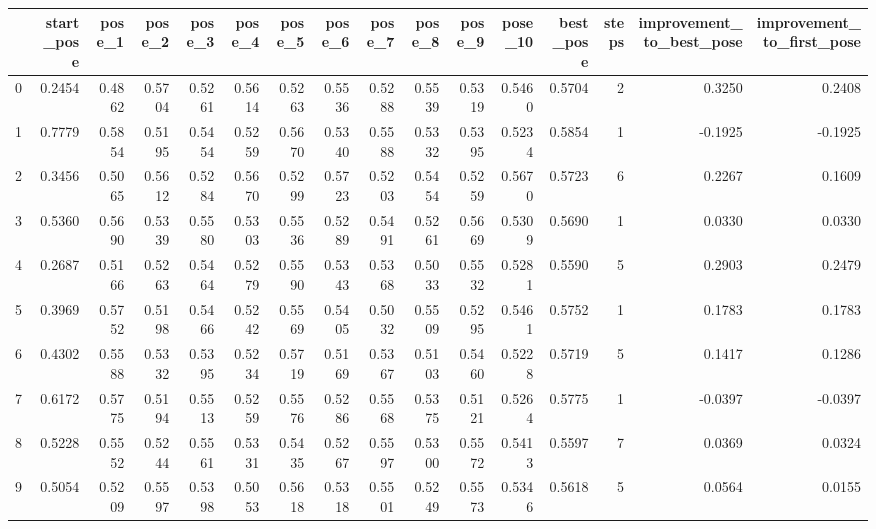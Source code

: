 \begin{tabular}{lrrrrrrrrrrrrrrr}
\toprule
{} &  start\_pose &  pose\_1 &  pose\_2 &  pose\_3 &  pose\_4 &  pose\_5 &  pose\_6 &  pose\_7 &  pose\_8 &  pose\_9 &  pose\_10 &  best\_pose &  steps &  improvement\_to\_best\_pose &  improvement\_to\_first\_pose \\
\midrule
0   &      0.2454 &  0.4862 &  0.5704 &  0.5261 &  0.5614 &  0.5263 &  0.5536 &  0.5288 &  0.5539 &  0.5319 &   0.5460 &     0.5704 &      2 &                    0.3250 &                     0.2408 \\
1   &      0.7779 &  0.5854 &  0.5195 &  0.5454 &  0.5259 &  0.5670 &  0.5340 &  0.5588 &  0.5332 &  0.5395 &   0.5234 &     0.5854 &      1 &                   -0.1925 &                    -0.1925 \\
2   &      0.3456 &  0.5065 &  0.5612 &  0.5284 &  0.5670 &  0.5299 &  0.5723 &  0.5203 &  0.5454 &  0.5259 &   0.5670 &     0.5723 &      6 &                    0.2267 &                     0.1609 \\
3   &      0.5360 &  0.5690 &  0.5339 &  0.5580 &  0.5303 &  0.5536 &  0.5289 &  0.5491 &  0.5261 &  0.5669 &   0.5309 &     0.5690 &      1 &                    0.0330 &                     0.0330 \\
4   &      0.2687 &  0.5166 &  0.5263 &  0.5464 &  0.5279 &  0.5590 &  0.5343 &  0.5368 &  0.5033 &  0.5532 &   0.5281 &     0.5590 &      5 &                    0.2903 &                     0.2479 \\
5   &      0.3969 &  0.5752 &  0.5198 &  0.5466 &  0.5242 &  0.5569 &  0.5405 &  0.5032 &  0.5509 &  0.5295 &   0.5461 &     0.5752 &      1 &                    0.1783 &                     0.1783 \\
6   &      0.4302 &  0.5588 &  0.5332 &  0.5395 &  0.5234 &  0.5719 &  0.5169 &  0.5367 &  0.5103 &  0.5460 &   0.5228 &     0.5719 &      5 &                    0.1417 &                     0.1286 \\
7   &      0.6172 &  0.5775 &  0.5194 &  0.5513 &  0.5259 &  0.5576 &  0.5286 &  0.5568 &  0.5375 &  0.5121 &   0.5264 &     0.5775 &      1 &                   -0.0397 &                    -0.0397 \\
8   &      0.5228 &  0.5552 &  0.5244 &  0.5561 &  0.5331 &  0.5435 &  0.5267 &  0.5597 &  0.5300 &  0.5572 &   0.5413 &     0.5597 &      7 &                    0.0369 &                     0.0324 \\
9   &      0.5054 &  0.5209 &  0.5597 &  0.5398 &  0.5053 &  0.5618 &  0.5318 &  0.5501 &  0.5249 &  0.5573 &   0.5346 &     0.5618 &      5 &                    0.0564 &                     0.0155 \\

\end{tabular}
